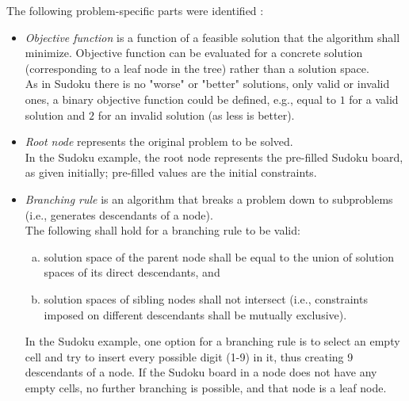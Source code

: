 The following problem-specific parts were identified \cite{clausen1999principles}:

\begin{itemize}
    \item \emph{Objective function} is a function of a feasible solution that the algorithm
        shall minimize.
        Objective function can be evaluated for a concrete solution
        (corresponding to a leaf node in the tree) rather than a solution space. \\
        As in Sudoku there is no "worse" or "better" solutions, only valid or invalid ones,
        a binary objective function could be defined, e.g., equal to
        $1$ for a valid solution and $2$ for an invalid solution (as less is better).

    \item \emph{Root node} represents the original problem to be solved. \\
        In the Sudoku example,
        the root node represents the pre-filled Sudoku board, as given initially;
        pre-filled values are the initial constraints.

    \item \emph{Branching rule} is an algorithm that breaks a problem down to subproblems
        (i.e., generates descendants of a node). \\
        The following shall hold for a branching rule to be valid:
        \begin{enumerate}[(a)]
        \item solution space of the parent node shall be equal to the union of solution spaces of its
            direct descendants, and
        \item solution spaces of sibling nodes shall not intersect (i.e.,
            constraints imposed on different descendants shall be mutually exclusive).
        \end{enumerate}

        In the Sudoku example, one option for a branching rule is to select an empty cell
        and try to insert every possible digit (1-9) in it, thus creating 9 descendants of a node.
        If the Sudoku board in a node does not have any empty cells, no further branching is possible,
        and that node is a leaf node.


\end{itemize}
